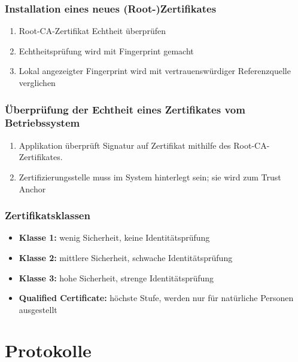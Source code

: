 \documentclass[12pt]{scrartcl}
\begin{document}
\newpage
\subsubsection{Installation eines neues (Root-)Zertifikates}

\begin{enumerate}
    \item Root-CA-Zertifikat Echtheit überprüfen
    \item Echtheitsprüfung wird mit Fingerprint gemacht
    \item Lokal angezeigter Fingerprint wird mit vertrauenswürdiger Referenzquelle verglichen
\end{enumerate}


\subsubsection{Überprüfung der Echtheit eines Zertifikates vom Betriebssystem}

\begin{enumerate}
    \item Applikation überprüft Signatur auf Zertifikat mithilfe des Root-CA-Zertifikates.
    \item Zertifizierungsstelle muss im System hinterlegt sein; sie wird zum Trust Anchor
\end{enumerate}



\subsubsection{Zertifikatsklassen}

\begin{itemize}
    \item \textbf{Klasse 1:} wenig Sicherheit, keine Identitätsprüfung
    \item \textbf{Klasse 2:} mittlere Sicherheit, schwache Identitätsprüfung
    \item \textbf{Klasse 3:} hohe Sicherheit, strenge Identitätsprüfung
    \item \textbf{Qualified Certificate:} höchste Stufe, werden nur für natürliche Personen ausgestellt
\end{itemize}


\newpage
\section{Protokolle}
\end{document}
